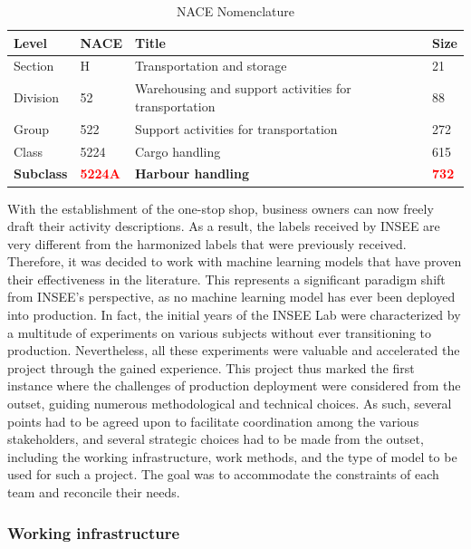 \begin{table}[htbp]
    \centering
    \begin{tabular}{llll}
    \textbf{Level} & \textbf{NACE} & \textbf{Title} & \textbf{Size} \\ \hline
    Section & H & Transportation and storage & 21 \\ \hline
    Division & 52 & Warehousing and support activities for transportation & 88 \\ \hline
    Group & 522 & Support activities for transportation & 272 \\ \hline
    Class & 5224 & Cargo handling & 615 \\ \hline
    \textbf{Subclass} & \textbf{\textcolor{red}{5224A}} & \textbf{Harbour handling} & \textbf{\textcolor{red}{732}} \\ 
    \end{tabular}
    \caption{NACE Nomenclature}
    \label{tab:nace-nomenclature}
    \end{table}


With the establishment of the one-stop shop, business owners can now freely draft their activity descriptions. As a result, the labels received by INSEE are very different from the harmonized labels that were previously received. Therefore, it was decided to work with machine learning models that have proven their effectiveness in the literature. This represents a significant paradigm shift from INSEE's perspective, as no machine learning model has ever been deployed into production. In fact, the initial years of the INSEE Lab were characterized by a multitude of experiments on various subjects without ever transitioning to production. Nevertheless, all these experiments were valuable and accelerated the project through the gained experience. This project thus marked the first instance where the challenges of production deployment were considered from the outset, guiding numerous methodological and technical choices. As such, several points had to be agreed upon to facilitate coordination among the various stakeholders, and several strategic choices had to be made from the outset, including the working infrastructure, work methods, and the type of model to be used for such a project. The goal was to accommodate the constraints of each team and reconcile their needs.

\subsubsection{Working infrastructure}

